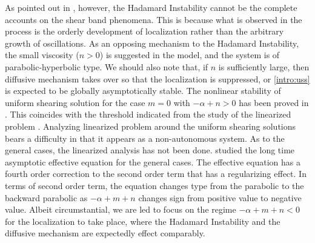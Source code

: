 \documentclass[a4paper,11pt]{article}
\theoremstyle{remark}
\begin{document}
As pointed out in \cite{KOT14}, however, the Hadamard Instability cannot be the complete accounts on the shear band phenomena. This is because what is observed in the process is the orderly development of localization \cite{zener_effect_1944} rather than the arbitrary growth of oscillations. As an opposing mechanism to the Hadamard Instability, the small viscosity ($n>0$) is suggested in the model, and the system is of parabolic-hyperbolic type. We should also note that, if $n$ is sufficiently large, then diffusive mechanism takes over so that the localization is suppressed, or \eqref{intro:uss} is expected to be globally asymptotically stable. The nonlinear stability of uniform shearing solution for the case $m=0$ with $-\alpha+n>0$ has been proved in \cite{DH_1983, Tz_1986, tzavaras_strain_1991, KT09}. This coincides with the threshold indicated from the study of the linearized problem \cite{FM87}. Analyzing linearized problem around the uniform shearing solutions bears a difficulty in that it appears as a non-autonomous system. As to the general cases, the linearized analysis has not been done. \cite{KT09} studied the long time asymptotic effective equation for the general cases. The effective equation has a fourth order correction to the second order term that has a regularizing effect. In terms of second order term, the equation changes type from the parabolic to the backward parabolic as $-\alpha+m+n$ changes sign from positive value to negative value. Albeit circumstantial, we are led to focus on the regime $-\alpha+m+n<0$ for the localization to take place, where the Hadamard Instability and the diffusive mechanism are expectedly effect comparably.%
\end{document}
